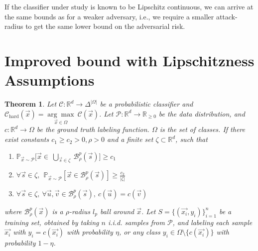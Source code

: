 \documentclass{ociamthesis}
\newtheorem{theorem}{Theorem}
\begin{document}
If the classifier under study is known to be Lipschitz continuous, we can arrive
at the same bounds as \citet{sanyal2021how} for a weaker adversary, i.e., we
require a smaller attack-radius to get the same lower bound on the adversarial
risk.

\section*{Improved bound with Lipschitzness Assumptions}

\begin{theorem}
    \label{theorem:Lipschitzness-extension}
    Let $\mathcal{C}: \mathbb{R}^d \to \Delta^{|\Omega|}$ be a probabilistic
    classifier and $\mathcal{C}_\text{hard}(\vec{x}) = \underset{\vec{x} \in
    \Omega}{\arg\max}~\mathcal{C}(\vec{x})$. Let $\mathcal{P}: \mathbb{R}^d \to
    \mathbb{R}_{\geq 0}$ be the data distribution, and $c: \mathbb{R}^d \to
    \Omega$ be the ground truth labeling function. $\Omega$ is the set of
    classes. If there exist constants $c_1 \geq c_2 > 0, \rho > 0$ and a finite
    set $\zeta \subset \mathbb{R}^d$, such that
    \begin{enumerate}
        \item $\mathbb{P}_{\vec{x} \sim \mathcal{P}} \bigg [\vec{x}\in
        ~\underset{\vec{s} \in \zeta}{\bigcup}~\mathcal{B}_\rho^p(\vec{s}) \bigg
        ] \geq c_1$
        \item $\forall \vec{s} \in \zeta,~~ \mathbb{P}_{\vec{x} \sim
        \mathcal{P}} [\vec{x}\in \mathcal{B}_\rho^p(\vec{s})] \geq
        \frac{c_2}{|\zeta|}$
        \item $\forall \vec{s} \in \zeta,~\forall \vec{u}, \vec{v} \in
        \mathcal{B}_\rho^p(\vec{s}),~c(\vec{u}) = c(\vec{v})$
    \end{enumerate}
    where $\mathcal{B}^p_\rho(\vec{x})$ is a $\rho$-radius $l_p$ ball around
    $\vec{x}$. Let $S=\{(\vec{x_i},y_i)\}_{i=1}^n$ be a training set, obtained
    by taking $n$ i.i.d. samples from $\mathcal{P}$, and labeling each sample
    $\vec{x_i}$ with $y_i=c(\vec{x_i})$ with probability $\eta$, or any class
    $y_i\in\Omega\setminus\{c(\vec{x_i})\}$ with probability $1-\eta$.
    

\end{theorem}
\end{document}
